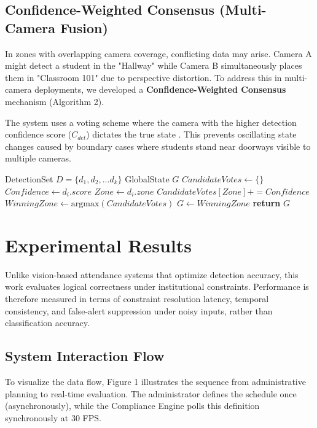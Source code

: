 \documentclass[conference]{IEEEtran}
\providecommand{\RETURN}{\STATE \textbf{return} }
\begin{document}
\subsection{Confidence-Weighted Consensus (Multi-Camera Fusion)}
In zones with overlapping camera coverage, conflicting data may arise. Camera A might detect a student in the "Hallway" while Camera B simultaneously places them in "Classroom 101" due to perspective distortion. To address this in multi-camera deployments, we developed a \textbf{Confidence-Weighted Consensus} mechanism (Algorithm 2).

The system uses a voting scheme where the camera with the higher detection confidence score ($C_{det}$) dictates the true state \cite{b11}. This prevents oscillating state changes caused by boundary cases where students stand near doorways visible to multiple cameras.

\begin{algorithm}[H]
\caption{Confidence-Weighted Consensus}
\begin{algorithmic}[1]
\REQUIRE DetectionSet $D = \{d_1, d_2, ... d_k\}$
\ENSURE GlobalState $G$
\STATE $CandidateVotes \leftarrow \{\}$
\STATE $Confidence \leftarrow d_i.score$
\STATE $Zone \leftarrow d_i.zone$
\STATE $CandidateVotes[Zone] += Confidence$
\ENDFOR
\STATE $WinningZone \leftarrow \text{argmax}(CandidateVotes)$
\STATE $G \leftarrow WinningZone$
\RETURN $G$
\end{algorithmic}
\label{alg:consensus}
\end{algorithm}

\section{Experimental Results}

Unlike vision-based attendance systems that optimize detection accuracy, this work evaluates logical correctness under institutional constraints. Performance is therefore measured in terms of constraint resolution latency, temporal consistency, and false-alert suppression under noisy inputs, rather than classification accuracy.

\subsection{System Interaction Flow}
To visualize the data flow, Figure 1 illustrates the sequence from administrative planning to real-time evaluation. The administrator defines the schedule once (asynchronously), while the Compliance Engine polls this definition synchronously at 30 FPS.
\end{document}
